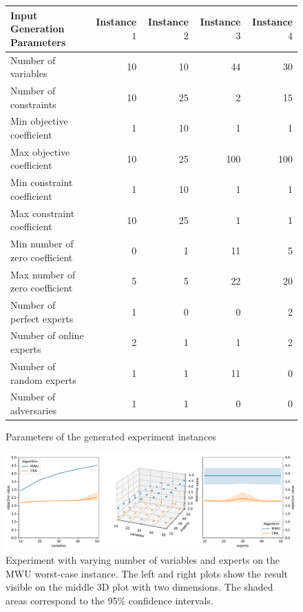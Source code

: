 \begin{figure}[!ht]
\centering
\begin{tabular}{l|r|r|r|r}
Input Generation Parameters & Instance $1$ & Instance $2$ & Instance $3$ & Instance $4$ \\
\hline
Number of variables            & 10 & 10 & 44  & 30 \\
Number of constraints          & 10 & 25 & 2   & 15 \\
Min objective coefficient      & 1  & 10 & 1   & 1  \\
Max objective coefficient      & 10 & 25 & 100 & 100\\
Min constraint coefficient     & 1  & 10 & 1   & 1 \\
Max constraint coefficient     & 10 & 25 & 1   & 1 \\
Min number of zero coefficient & 0  &  1 & 11  & 5 \\
Max number of zero coefficient & 5  &  5 & 22  & 20 \\
Number of perfect experts      & 1  &  0 & 0   & 2 \\
Number of online experts       & 2  &  1 & 1   & 2 \\
Number of random experts       & 1  &  1 & 11  & 0 \\
Number of adversaries          & 1  &  1 & 0   & 0 \\
\end{tabular}
\caption{Parameters of the generated experiment instances}
\label{fig:exp-params}
\end{figure}

\begin{figure}[!ht]
    \centering
    \includegraphics[width=\linewidth]{./Img/worst_case_figure.pdf}
    \caption{Experiment with varying number of variables and experts on the MWU worst-case instance. The left and right plots show the result visible on the middle 3D plot with two dimensions. The shaded areas correspond to the 95\% confidence intervals.}
    \label{fig:exp2-3d}
\end{figure}